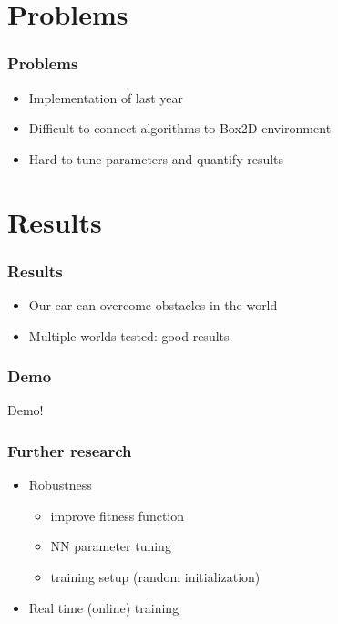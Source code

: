 \documentclass{beamer}
\begin{document}
\section{Problems}
\begin{frame}[fragile]
  \frametitle{Problems}
  \begin{itemize}
    \item Implementation of last year
    \item Difficult to connect algorithms to Box2D environment
    \item Hard to tune parameters and quantify results
  \end{itemize}
\end{frame}

\section{Results}
\begin{frame}[fragile]
  \frametitle{Results}
  \begin{itemize}
    \item Our car can overcome obstacles in the world
    \item Multiple worlds tested: good results
  \end{itemize}
\end{frame}

\begin{frame}[fragile]
  \frametitle{Demo}
  Demo!
\end{frame}

\begin{frame}[fragile]
  \frametitle{Further research}
  \begin{itemize}
    \item Robustness
      \begin{itemize}
	\item improve fitness function
	\item NN parameter tuning
	\item training setup (random initialization)
      \end{itemize}
    \item Real time (online) training
  \end{itemize}
\end{frame}
\end{document}
